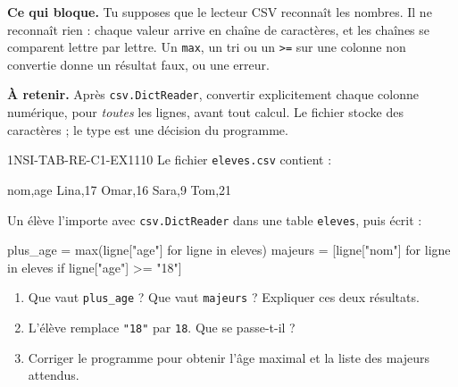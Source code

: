 

\textbf{Ce qui bloque.} Tu supposes que le lecteur CSV reconnaît les nombres. Il ne
reconnaît rien : chaque valeur arrive en chaîne de caractères, et les chaînes se comparent
lettre par lettre. Un \lstinline{max}, un tri ou un \lstinline{>=} sur une colonne non
convertie donne un résultat faux, ou une erreur.

\textbf{À retenir.} Après \lstinline{csv.DictReader}, convertir explicitement chaque colonne
numérique, pour \emph{toutes} les lignes, avant tout calcul. Le fichier stocke des
caractères ; le type est une décision du programme.

\begin{exercice}{1NSI-TAB-RE-C1-EX1}{1}{10}
Le fichier \lstinline{eleves.csv} contient :
\begin{console}
nom,age
Lina,17
Omar,16
Sara,9
Tom,21
\end{console}
Un élève l'importe avec \lstinline{csv.DictReader} dans une table \lstinline{eleves}, puis
écrit :
\begin{python}
plus_age = max(ligne["age"] for ligne in eleves)
majeurs = [ligne["nom"] for ligne in eleves if ligne["age"] >= "18"]
\end{python}
\begin{enumerate}
  \item Que vaut \lstinline{plus_age} ? Que vaut \lstinline{majeurs} ? Expliquer ces deux
        résultats.
  \item L'élève remplace \lstinline{"18"} par \lstinline{18}. Que se passe-t-il ?
  \item Corriger le programme pour obtenir l'âge maximal et la liste des majeurs attendus.
\end{enumerate}
\end{exercice}

